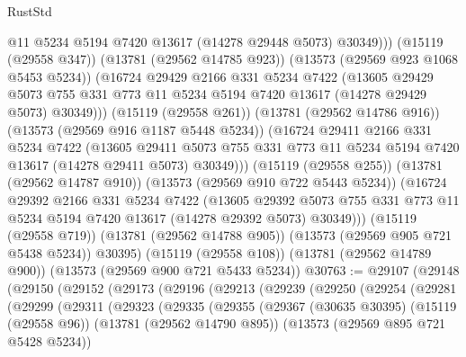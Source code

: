 \begin{lexlean}{RustStd}
\begin{coremodule}
                  @11
                  @5234
                  @5194
                  @7420
                  @13617
                  (@14278 @29448 @5073)
                  @30349)))
            (@15119 (@29558 @347))
            (@13781 (@29562 @14785 @923))
            (@13573 (@29569 @923 @1068 @5453 @5234))
            (@16724
              @29429
              @2166
              @331
              @5234
              @7422
              (@13605
                @29429
                @5073
                @755
                @331
                @773
                @11
                @5234
                @5194
                @7420
                @13617
                (@14278 @29429 @5073)
                @30349)))
          (@15119 (@29558 @261))
          (@13781 (@29562 @14786 @916))
          (@13573 (@29569 @916 @1187 @5448 @5234))
          (@16724
            @29411
            @2166
            @331
            @5234
            @7422
            (@13605
              @29411
              @5073
              @755
              @331
              @773
              @11
              @5234
              @5194
              @7420
              @13617
              (@14278 @29411 @5073)
              @30349)))
        (@15119 (@29558 @255))
        (@13781 (@29562 @14787 @910))
        (@13573 (@29569 @910 @722 @5443 @5234))
        (@16724
          @29392
          @2166
          @331
          @5234
          @7422
          (@13605
            @29392
            @5073
            @755
            @331
            @773
            @11
            @5234
            @5194
            @7420
            @13617
            (@14278 @29392 @5073)
            @30349)))
      (@15119 (@29558 @719))
      (@13781 (@29562 @14788 @905))
      (@13573 (@29569 @905 @721 @5438 @5234))
      @30395)
    (@15119 (@29558 @108))
    (@13781 (@29562 @14789 @900))
    (@13573 (@29569 @900 @721 @5433 @5234))
@30763 := @29107
    (@29148
      (@29150
        (@29152
          (@29173
            (@29196
              (@29213
                (@29239
                  (@29250
                    (@29254
                      (@29281
                        (@29299
                          (@29311
                            (@29323
                              (@29335
                                (@29355
                                  (@29367
                                    (@30635 @30395)
                                    (@15119 (@29558 @96))
                                    (@13781 (@29562 @14790 @895))
                                    (@13573 (@29569 @895 @721 @5428 @5234))

\end{coremodule}
\end{lexlean}
